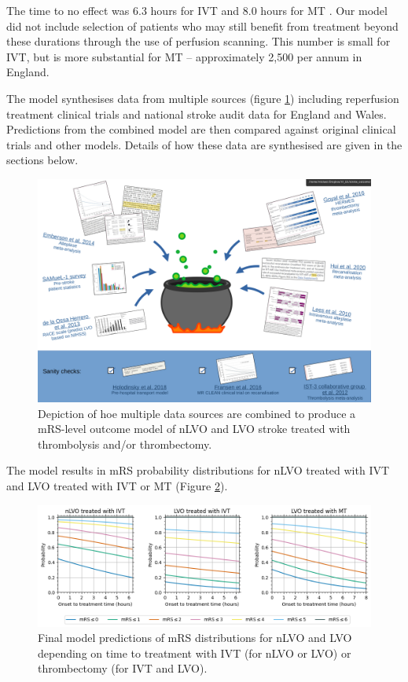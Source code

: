 The time to no effect was 6.3 hours for IVT \cite{emberson_effect_2014} and 8.0 hours for MT \cite{ fransen_time_2016}. Our model did not include selection of patients who may still benefit from treatment beyond these durations through the use of perfusion scanning. This number is small for IVT, but is more substantial for MT – approximately 2,500 per annum in England. 

The model synthesises data from multiple sources (figure \ref{fig:data_cauldron}) including reperfusion treatment clinical trials and national stroke audit data for England and Wales. Predictions from the combined model are then compared against original clinical trials and other models. Details of how these data are synthesised are given in the sections below.

\begin{figure}[h!]
    \centering
    \includegraphics[width=1.0\linewidth]{images_modelling/data_cauldron.png}
    \caption{Depiction of hoe multiple data sources are combined to produce a mRS-level outcome model of nLVO and LVO stroke treated with thrombolysis and/or thrombectomy.}
    \label{fig:data_cauldron}
\end{figure}

The model results in mRS probability distributions for nLVO treated with IVT and LVO treated with IVT or MT (Figure \ref{fig:probs_with_time}).

\begin{figure}[h!]
    \centering
    \includegraphics[width=1.0\linewidth]{images_modelling/probs_with_time.png}
    \caption{Final model predictions of mRS distributions for nLVO and LVO depending on time to treatment with IVT (for nLVO or LVO) or thrombectomy (for IVT and LVO).}
    \label{fig:probs_with_time}
\end{figure}

